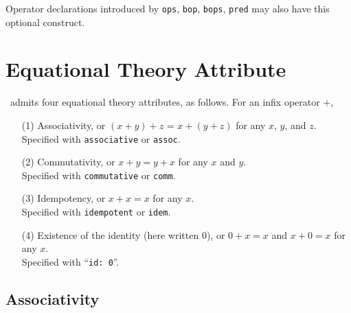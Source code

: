 \documentclass[a4paper]{memoir}
\begin{document}
Operator declarations introduced by \verb|ops|, \verb|bop|, \verb|bops|,
\verb|pred| may also have this optional construct.

\section{Equational Theory Attribute}\label{sec:p2-equational-theory}
\cafeobj~admits four equational theory attributes, as follows. For
an infix operator $+$,
\begin{itemize}
\item[(1)] Associativity, or $(x + y) + z$ = $x + (y + z)$ for any
  $x$, $y$, and $z$. \\
  Specified with \verb|associative| or \verb|assoc|.
\item[(2)] Commutativity, or $x + y = y + x$ for any $x$ and $y$. \\
  Specified with \verb|commutative| or \verb|comm|.
\item[(3)] Idempotency, or $x + x = x$ for any $x$. \\
  Specified with \verb|idempotent| or \verb|idem|.
\item[(4)] Existence of the identity (here written $0$), or
  $0 + x = x$ and $x + 0 = x$ for any $x$. \\
  Specified with ``\verb|id: 0|''.
\end{itemize}

\subsection{Associativity}
\end{document}

